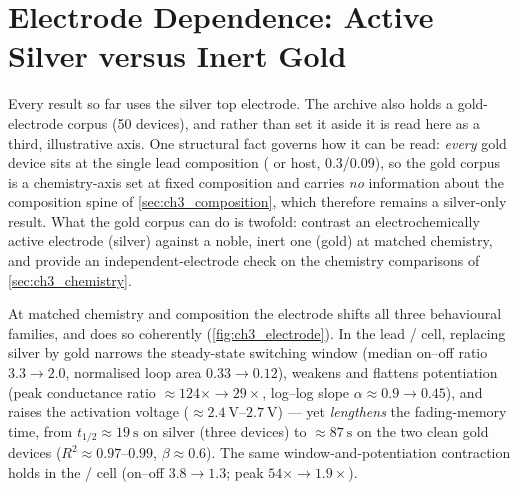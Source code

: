 \documentclass[12pt, twoside]{report}
\begin{document}
\section{Electrode Dependence: Active Silver versus Inert Gold}\label{sec:ch3_electrode}

Every result so far uses the silver top electrode. The archive also holds a gold-electrode corpus (\num{50} devices), and rather than set it aside it is read here as a third, illustrative axis. One structural fact governs how it can be read: \emph{every} gold device sits at the single lead composition (\PEO{} or \TMPE{} host, \num{0.3}/\num{0.09}), so the gold corpus is a chemistry-axis set at fixed composition and carries \emph{no} information about the composition spine of \cref{sec:ch3_composition}, which therefore remains a silver-only result. What the gold corpus can do is twofold: contrast an electrochemically active electrode (silver) against a noble, inert one (gold) at matched chemistry, and provide an independent-electrode check on the chemistry comparisons of \cref{sec:ch3_chemistry}.

At matched chemistry and composition the electrode shifts all three behavioural families, and does so coherently (\cref{fig:ch3_electrode}). In the lead \PEO{}/\LiTf{} cell, replacing silver by gold narrows the steady-state switching window (median on--off ratio \(3.3\to2.0\), normalised loop area \(0.33\to0.12\)), weakens and flattens potentiation (peak conductance ratio \(\approx124\times\to29\times\), log--log slope \(\alpha\approx0.9\to0.45\)), and raises the activation voltage (\(\approx\SIrange{2.4}{2.7}{\volt}\)) --- yet \emph{lengthens} the fading-memory time, from \(t_{1/2}\approx\SI{19}{\second}\) on silver (three devices) to \(\approx\SI{87}{\second}\) on the two clean gold devices (\(R^2\approx0.97\text{--}0.99\), \(\beta\approx0.6\)). The same window-and-potentiation contraction holds in the \TMPE{}/\LiTf{} cell (on--off \(3.8\to1.3\); peak \(54\times\to1.9\times\)).
\end{document}
